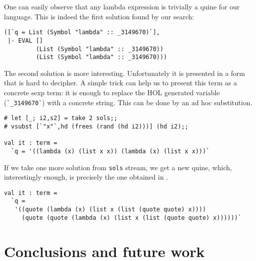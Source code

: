 One can easily observe that any lambda expression is trivially a quine
for our language.  This is indeed the first solution found by our
search:
\begin{verbatim}
([`q = List (Symbol "lambda" :: _3149670)`],
 |- EVAL []
         (List (Symbol "lambda" :: _3149670))
         (List (Symbol "lambda" :: _3149670)))
\end{verbatim}

The second solution is more interesting.  Unfortunately it is
presented in a form that is hard to decipher.  A simple trick can help
us to present this term as a concrete sexp term: it is enough to
replace the HOL generated variable (\verb|`_3149670`|) with a concrete
string.  This can be done by an ad hoc substitution.
\begin{verbatim}
# let [_; i2,s2] = take 2 sols;;
# vsubst [`"x"`,hd (frees (rand (hd i2)))] (hd i2);;

val it : term =
  `q = '((lambda (x) (list x x)) (lambda (x) (list x x)))`
\end{verbatim}

If we take one more solution from \verb|sols| stream, we get a new
quine, which, interestingly enough, is precisely the one obtained in
\cite{Byrd:2012:MLU:2661103.2661105}.
\begin{verbatim}
val it : term =
  `q =
   '((quote (lambda (x) (list x (list (quote quote) x))))
     (quote (quote (lambda (x) (list x (list (quote quote) x))))))`
\end{verbatim}

\section{Conclusions and future work}
\label{sec:conclusions}


